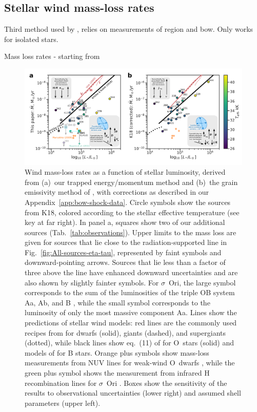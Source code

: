 \subsection{Stellar wind mass-loss rates}
\label{sec:stellar-wind-mass}

Third method used by \citet{Gvaramadze:2012a}, relies on measurements
of \hii{} region and bow. Only works for isolated stars.

Mass loss rates - starting from \citet{Kobulnicky:2010a}

\begin{figure}
  \centering
  \includegraphics[width=\linewidth]{figs/Mdot-vs-lum-combo-edited}
  \caption{Wind mass-loss rates as a function of stellar luminosity,
    derived from (a)~our trapped energy/momentum method and (b)~the
    grain emissivity method of \citet{Kobulnicky:2018a}, with
    corrections as described in our Appendix~\ref{app:bow-shock-data}.
    Circle symbols show the sources from K18, colored according to the
    stellar effective temperature (see key at far right). In panel a,
    squares show two of our additional sources
    (Tab.~\ref{tab:observations}). Upper limits to the mass loss are
    given for sources that lie close to the radiation-supported line
    in Fig.~\ref{fig:All-sources-eta-tau}, represented by faint
    symbols and downward-pointing arrows.  Sources that lie less than
    a factor of three above the line have enhanced downward
    uncertainties and are also shown by slightly fainter symbols.  For
    \(\sigma\)~Ori, the large symbol corresponds to the sum of the
    luminosities of the triple OB system Aa, Ab, and B
    \citep{Simon-Diaz:2015a}, while the small symbol corresponds to
    the luminosity of only the most massive component Aa.  Lines show
    the predictions of stellar wind models: red lines are the commonly
    used recipes from \citet{Vink:2000a} for dwarfs (solid), giants
    (dashed), and supergiants (dotted), while black lines show
    eq.~(11) of \citet{Krticka:2017a} for O~stars (solid) and models
    of \citet{Krticka:2014a} for B stars.  Orange plus symbols show
    mass-loss measurements from NUV lines for weak-wind O~dwarfs
    \citep{Marcolino:2009a}, while the green plus symbol shows the
    measurement from infrared H recombination lines for \(\sigma\)~Ori
    \citep{Najarro:2011a}.  Boxes show the sensitivity of the results
    to observational uncertainties (lower right) and assumed shell
    parameters (upper left).}
  \label{fig:mass-loss-vs-luminosity}
\end{figure}


